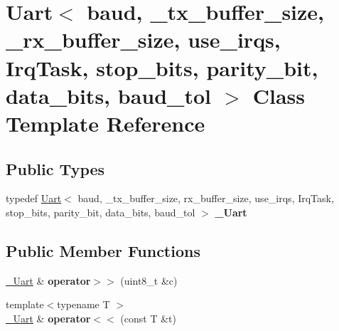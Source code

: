 \hypertarget{classUart}{}\section{Uart$<$ baud, \+\_\+tx\+\_\+buffer\+\_\+size, \+\_\+rx\+\_\+buffer\+\_\+size, use\+\_\+irqs, Irq\+Task, stop\+\_\+bits, parity\+\_\+bit, data\+\_\+bits, baud\+\_\+tol $>$ Class Template Reference}
\label{classUart}
\subsection*{Public Types}
\begin{DoxyCompactItemize}
\item 
typedef \hyperlink{classUart}{Uart}$<$ baud, \+\_\+tx\+\_\+buffer\+\_\+size, rx\+\_\+buffer\+\_\+size, use\+\_\+irqs, Irq\+Task, stop\+\_\+bits, parity\+\_\+bit, data\+\_\+bits, baud\+\_\+tol $>$ {\bfseries \+\_\+\+Uart}\hypertarget{classUart_a6a4ba865a0631578cdeb39a73672db7a}{}\label{classUart_a6a4ba865a0631578cdeb39a73672db7a}

\end{DoxyCompactItemize}
\subsection*{Public Member Functions}
\begin{DoxyCompactItemize}
\item 
\hyperlink{classUart}{\+\_\+\+Uart} \& {\bfseries operator$>$$>$} (uint8\+\_\+t \&c)\hypertarget{classUart_afc331ecc0055d7a548f8c3287fa7dd42}{}\label{classUart_afc331ecc0055d7a548f8c3287fa7dd42}

\item 
{\footnotesize template$<$typename T $>$ }\\\hyperlink{classUart}{\+\_\+\+Uart} \& {\bfseries operator$<$$<$} (const T \&t)\hypertarget{classUart_a9c37572450828368197a6f3b9e105d37}{}\label{classUart_a9c37572450828368197a6f3b9e105d37}

\end{DoxyCompactItemize}
